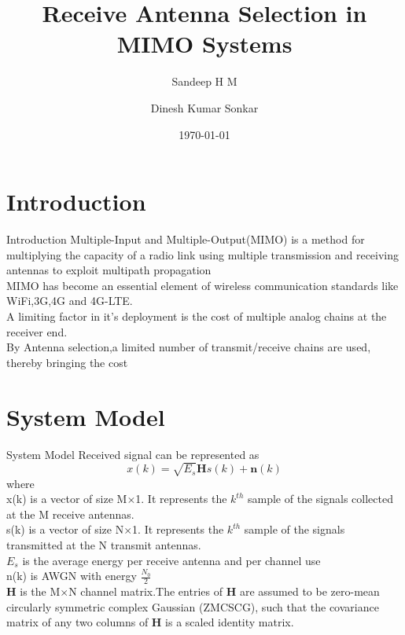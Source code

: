 \documentclass{beamer}
\title{Receive Antenna Selection in MIMO Systems}
\author{Sandeep H M \and Dinesh Kumar Sonkar}
\date{\today}
\begin{document}
\begin{frame}
  \titlepage
\end{frame}

\section{Introduction}
\begin{frame}{Introduction}
Multiple-Input and Multiple-Output(MIMO) is a method for multiplying the capacity of a radio link using multiple transmission and receiving antennas to exploit multipath propagation\\
\vskip 0.2in
MIMO has become an essential element of wireless communication standards like WiFi,3G,4G and 4G-LTE.\\
\vskip 0.2in
A limiting factor in it's deployment is the cost of multiple analog chains at the receiver end.\\
\vskip 0.2in
By Antenna selection,a limited number of transmit/receive chains are used, thereby bringing the cost
    
\end{frame}

\section{System Model}
\begin{frame}{System Model}
Received signal can be represented as 
\begin{equation*}
    x(k) =\sqrt{E_s}\boldsymbol{H}s(k)+ \boldsymbol{n}(k)
\end{equation*}
where\\
x(k) is a vector of size M$\times$1. It represents the $k^{th}$ sample of the signals collected at the M receive antennas.\\
\vskip 0.1in
s(k) is a vector of size N$\times$1. It represents the $k^{th}$ sample of the signals transmitted at the N transmit antennas.\\
\vskip 0.1in
$E_s$ is the average energy per receive antenna and per channel use\\
\vskip 0.1in
n(k)  is AWGN with energy $\frac{N_0}{2}$\\
\vskip 0.1in
\textbf{H} is the M$\times$N channel matrix.The entries of \textbf{H} are assumed to be zero-mean circularly symmetric complex Gaussian (ZMCSCG), such that the covariance matrix of any two columns of \textbf{H} is a scaled identity matrix.
\end{frame}
\end{document}
